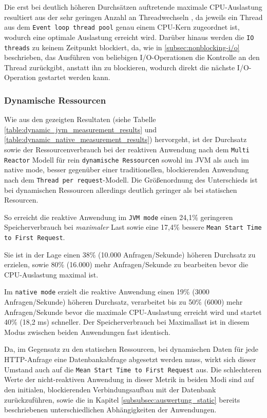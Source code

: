 Die erst bei deutlich höheren Durchsätzen auftretende maximale CPU-Auslastung resultiert aus der sehr geringen Anzahl an Threadwechseln
, da jeweils ein Thread aus dem \verb|Event loop thread pool| genau einem CPU-Kern zugeordnet ist, wodurch eine optimale Auslastung erreicht
wird. Darüber hinaus werden die \verb|IO threads| zu keinem Zeitpunkt blockiert, da, wie in \ref{subsec:nonblocking-i/o}
beschrieben, das Ausführen von beliebigen I/O-Operationen die Kontrolle an den Thread zurückgibt, anstatt ihn zu blockieren,
wodurch direkt die nächste I/O-Operation gestartet werden kann.
\subsubsection{Dynamische Ressourcen}
\label{subsubsec:auswertung_dynamic}
Wie aus den gezeigten Resultaten (siehe Tabelle \ref{table:dynamic_jvm_measurement_results} und
\ref{table:dynamic_native_measurement_results}) hervorgeht, ist der Durchsatz sowie der Ressourcenverbrauch bei der
reaktiven Anwendung nach dem \verb|Multi Reactor| Modell für rein \verb|dynamische Ressourcen| sowohl im JVM als auch im native mode,
besser gegenüber einer traditionellen, blockierenden Anwendung nach dem \verb|Thread per request|-Modell.
Die Größenordnung des Unterschieds ist bei dynamischen Ressourcen allerdings deutlich geringer als bei statischen Resourcen.

So erreicht die reaktive Anwendung im \verb|JVM mode| einen 24,1\% geringeren Speicherverbrauch bei \textit{maximaler} Last
sowie eine 17,4\% bessere \verb|Mean Start Time to First Request|.

Sie ist in der Lage einen 38\% (10.000 Anfragen/Sekunde) höheren Durchsatz zu erzielen,
sowie 80\% (16.000) mehr Anfragen/Sekunde zu bearbeiten bevor die CPU-Auslastung maximal ist.

Im \verb|native mode| erzielt die reaktive Anwendung einen 19\% (3000 Anfragen/Sekunde) höheren Durchsatz, verarbeitet bis zu
50\% (6000) mehr Anfragen/Sekunde bevor die maximale CPU-Auslastung erreicht wird und startet 40\% (18,2 ms) schneller.
Der Speicherverbrauch bei Maximallast ist in diesem Modus zwischen beiden Anwendungen fast identisch.

Da, im Gegensatz zu den statischen Ressourcen, bei dynamischen Daten für jede HTTP-Anfrage eine Datenbankabfrage abgesetzt werden
muss, wirkt sich dieser Umstand auch auf die \verb|Mean Start Time to First Request| aus.
Die schlechteren Werte der nicht-reaktiven Anwendung in dieser Metrik in beiden Modi sind auf den initialen, blockierenden
Verbindungsaufbau mit der Datenbank zurückzuführen, sowie die in Kapitel \ref{subsubsec:auswertung_static} bereits
beschriebenen unterschiedlichen Abhängigkeiten der Anwendungen.

